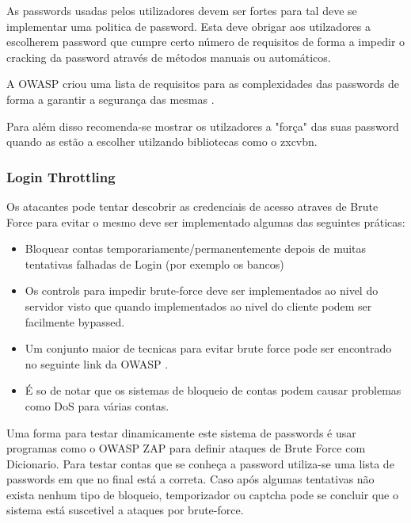 As passwords usadas pelos utilizadores devem ser fortes para tal deve se implementar uma politica de password. Esta deve obrigar aos utilzadores a escolherem password que cumpre certo número de requisitos de forma a impedir o cracking da password através de métodos manuais ou automáticos.

A OWASP criou uma lista de requisitos para as complexidades das passwords de forma a garantir a segurança das mesmas \cite{ref_intro9}.

Para além disso recomenda-se mostrar os utilzadores a "força" das suas password quando as estão a escolher utilzando bibliotecas como o zxcvbn.

\subsubsection{Login Throttling}

Os atacantes pode tentar descobrir as credenciais de acesso atraves de Brute Force para evitar o mesmo deve ser implementado algumas das seguintes práticas:

\begin{itemize}

\item Bloquear contas temporariamente/permanentemente depois de muitas tentativas falhadas de Login (por exemplo os bancos)

\item Os controls para impedir brute-force deve ser implementados ao nivel do servidor visto que quando implementados ao nivel do cliente podem ser facilmente bypassed.

\item Um conjunto maior de tecnicas para evitar brute force pode ser encontrado no seguinte link da OWASP \cite{ref_intro10}.

\item É so de notar que os sistemas de bloqueio de contas podem causar problemas como DoS para várias contas.

\end{itemize}

Uma forma para testar dinamicamente este sistema de passwords é usar programas como o OWASP ZAP para definir ataques de Brute Force com Dicionario. Para testar contas que se conheça a password utiliza-se uma lista de passwords em que no final está a correta. Caso após algumas tentativas não exista nenhum tipo de bloqueio, temporizador ou captcha pode se concluir que o sistema está suscetivel a ataques por brute-force.


